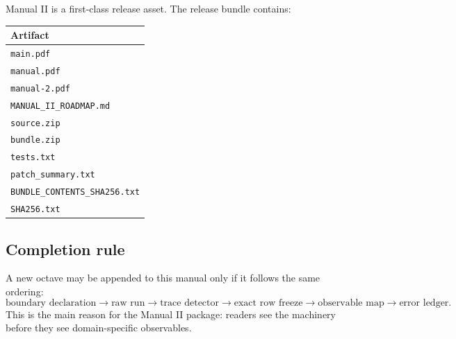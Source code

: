 Manual II is a first-class release asset. The release bundle contains:
\begin{center}
\begin{tabular}{@{}l@{}}
\toprule
Artifact \\
\midrule
\texttt{main.pdf} \\
\texttt{manual.pdf} \\
\texttt{manual-2.pdf} \\
\texttt{MANUAL\_II\_ROADMAP.md} \\
\texttt{source.zip} \\
\texttt{bundle.zip} \\
\texttt{tests.txt} \\
\texttt{patch\_summary.txt} \\
\texttt{BUNDLE\_CONTENTS\_SHA256.txt} \\
\texttt{SHA256.txt} \\
\bottomrule
\end{tabular}
\end{center}

\subsection{Completion rule}

A new octave may be appended to this manual only if it follows the same ordering:
\[
\text{boundary declaration} \to \text{raw run} \to \text{trace detector} \to \text{exact row freeze} \to \text{observable map} \to \text{error ledger}.
\]
This is the main reason for the Manual II package: readers see the machinery before they see domain-specific observables.
